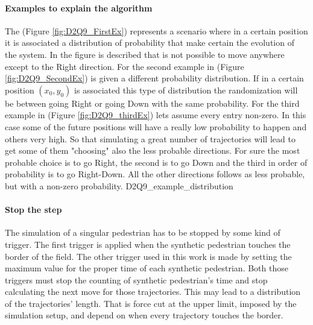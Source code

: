 \documentclass[class=article, crop=false]{standalone}
\begin{document}
\paragraph{Examples to explain the algorithm}
The (Figure \ref{fig:D2Q9_FirstEx}) represents a scenario where in a certain position it is associated a distribution of probability that make certain the evolution of the system.
In the figure is described that is not possible to move anywhere except to the Right direction.
For the second example in (Figure \ref{fig:D2Q9_SecondEx}) is given a different probability distribution.
If in a certain position $(x_0, y_0)$ is associated this type of distribution the randomization will be between going Right or going Down with the same probability.
For the third example in (Figure \ref{fig:D2Q9_thirdEx}) lets assume every entry non-zero.
In this case some of the future positions will have a really low probability to happen and others very high.
So that simulating a great number of trajectories will lead to get some of them "choosing" also the less probable directions.
For sure the most probable choice is to go Right, the second is to go Down and the third in order of probability is to go Right-Down.
All the other directions follows as less probable, but with a non-zero probability.
	{D2Q9_example_distribution}

\paragraph{Stop the step}
The simulation of a singular pedestrian has to be stopped by some kind of trigger.
The first trigger is applied when the synthetic pedestrian touches the border of the field.
The other trigger used in this work is made by setting the maximum value for the proper time of each synthetic pedestrian.
Both those triggers must stop the counting of synthetic pedestrian's time and stop calculating the next move for those trajectories.
This may lead to a distribution of the trajectories' length.
That is force cut at the upper limit, imposed by the simulation setup, and depend on when every trajectory touches the border.


\FloatBarrier
\end{document}
